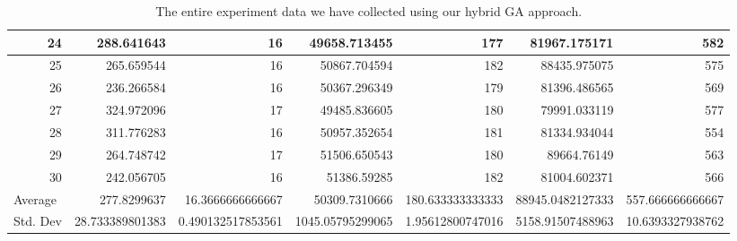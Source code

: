 \begin{table}
\begin{adjustwidth}{}{}
{{\begin{tabular}{|r|r|r|r|r|r|r|}
	\hline
	24                                         & 288.641643                   & 16                                    & 49658.713455                   & 177                                   & 81967.175171                 & 582                                    \\ 
	\hline
	25                                         & 265.659544                   & 16                                    & 50867.704594                   & 182                                   & 88435.975075                 & 575                                    \\ 
	\hline
	26                                         & 236.266584                   & 16                                    & 50367.296349                   & 179                                   & 81396.486565                 & 569                                    \\ 
	\hline
	27                                         & 324.972096                   & 17                                    & 49485.836605                   & 180                                   & 79991.033119                 & 577                                    \\ 
	\hline
	28                                         & 311.776283                   & 16                                    & 50957.352654                   & 181                                   & 81334.934044                 & 554                                    \\ 
	\hline
	29                                         & 264.748742                   & 17                                    & 51506.650543                   & 180                                   & 89664.76149                  & 563                                    \\ 
	\hline
	30                                         & 242.056705                   & 16                                    & 51386.59285                    & 182                                   & 81004.602371                 & 566                                    \\ 
	\hline
	\multicolumn{1}{|l|}{Average}              & 277.8299637                  & 16.3666666666667                      & 50309.7310666                  & 180.633333333333                      & 88945.0482127333             & 557.666666666667                       \\ 
	\hline
	\multicolumn{1}{|l|}{Std. Dev}             & 28.733389801383              & 0.490132517853561                     & 1045.05795299065               & 1.95612800747016                      & 5158.91507488963             & 10.6393327938762                       \\
	\hline
\end{tabular}}}
\end{adjustwidth}
\caption{The entire experiment data we have collected using our hybrid GA approach.}
\label{full-data-ga}
\end{table}

